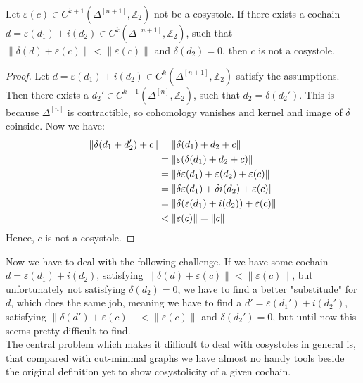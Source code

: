 \begin{prop}\label{proposition10}
Let \(\varepsilon(c)\in C^{k+1}(\Delta^{[n+1]},\mathbb{Z}_2)\) not be a cosystole. If there exists a cochain \(d=\varepsilon(d_1)+i(d_2)\in C^k(\Delta^{[n+1]},\mathbb{Z}_2)\), such that \(\|\delta(d)+\varepsilon(c)\|<\|\varepsilon(c)\|\) and \(\delta(d_2)=0\), then \(c\) is not a cosystole.
\begin{proof}
Let \(d=\varepsilon(d_1)+i(d_2)\in C^k(\Delta^{[n+1]},\mathbb{Z}_2)\) satisfy the assumptions. Then there exists a \(d_2'\in  C^{k-1}(\Delta^{[n]},\mathbb{Z}_2)\), such that \(d_2=\delta(d_2')\). This is because \(\Delta^{[n]}\) is contractible, so cohomology vanishes and kernel and image of \(\delta\) coinside. Now we have:
\begin{align}
\|\delta(d_1+d_2')+c\|&=\|\delta(d_1)+d_2+c\|\notag\\
&=\|\varepsilon(\delta(d_1)+d_2+c)\|\notag\\
&=\|\delta\varepsilon(d_1)+\varepsilon(d_2)+\varepsilon(c)\|\notag\\
&=\|\delta\varepsilon(d_1)+\delta i(d_2)+\varepsilon(c)\|\notag\\
&=\|\delta(\varepsilon(d_1)+i(d_2))+\varepsilon(c)\|\notag\\
&<\|\varepsilon(c)\|=\|c\|\notag
\end{align}
Hence, \(c\) is not a cosystole.
\end{proof}
\end{prop}
Now we have to deal with the following challenge. If we have some cochain \(d=\varepsilon(d_1)+i(d_2)\), satisfying \(\|\delta(d)+\varepsilon(c)\|<\|\varepsilon(c)\|\), but unfortunately not satisfying \(\delta(d_2)=0\), we have to find a better "substitude" for \(d\), which does the same job, meaning we have to find a \(d'=\varepsilon(d_1')+i(d_2')\), satisfying \(\|\delta(d')+\varepsilon(c)\|<\|\varepsilon(c)\|\) and \(\delta(d_2')=0\), but until now this seems pretty difficult to find.\\
The central problem which makes it difficult to deal with cosystoles in general is, that compared with cut-minimal graphs we have almost no handy tools beside the original definition yet to show cosystolicity of a given cochain.